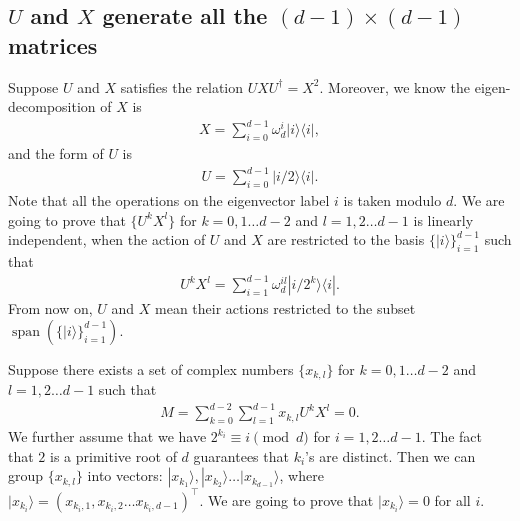 \documentclass[11pt,letterpaper]{article}
\newcommand{\ket}[1]{|#1\rangle}
\newcommand{\ketbra}[2]{|#1\rangle\langle#2|}
\DeclareMathOperator{\spn}{span}
\newcommand{\1}{\mathbb{1}}
\theoremstyle{definition}
\begin{document}
\subsection{$U$ and $X$ generate all the $(d-1)\times(d-1)$ matrices}
Suppose $U$ and $X$ satisfies the relation $UXU^\dagger = X^2$. Moreover, we know the eigen-decomposition
of $X$ is 
\begin{align}
	X = \sum_{i=0}^{d-1} \omega_d^i \ketbra{i}{i},
\end{align}
and the form of $U$ is
\begin{align}
	U =\sum_{i=0}^{d-1} \ketbra{i/2}{i}.
\end{align}
Note that all the operations on the eigenvector label $i$ is taken modulo $d$.
We are going to prove that $\{ U^k X^l \}$ for $k=0,1\dots d-2$ and $l = 1,2\dots d-1$ is linearly independent,
when the action of $U$ and $X$ are restricted to the basis $\{\ket{i}\}_{i=1}^{d-1}$ such that 
\begin{align}
	U^kX^l  = \sum_{i=1}^{d-1} \omega_d^{il} \ketbra{i/2^k}{i}.
\end{align}
From now on, $U$ and $X$ mean their actions restricted to the subset $\spn(\{\ket{i}\}_{i=1}^{d-1})$.

Suppose there exists a set of complex numbers $\{ x_{k,l} \}$ for $k=0,1\dots d-2$ and $l = 1,2\dots d-1$
such that 
\begin{align}
	M = \sum_{k=0}^{d-2} \sum_{l=1}^{d-1} x_{k,l} U^k X^l = 0. 
\end{align}
We further assume that we have $2^{k_i} \equiv i \pmod{d}$ for $i = 1,2\dots d-1$.
The fact that $2$ is a primitive root of $d$ guarantees that $k_i$'s are distinct.
Then we can group $\{x_{k,l}\}$ into vectors: $\ket{x_{k_1}}, \ket{x_{k_2}} \dots \ket{x_{k_{d-1}}}$,
where $\ket{x_{k_i}}= (x_{k_i, 1}, x_{k_i, 2} \dots x_{k_i, d-1})^\intercal$.
We are going to prove that $\ket{x_{k_i}} = 0$ for all $i$.
\end{document}
